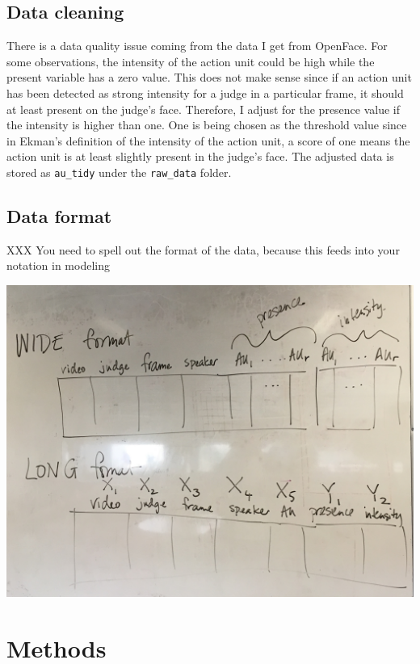 \documentclass{monashthesis}
\begin{document}
\hypertarget{data-cleaning}{%
\section{Data cleaning}\label{data-cleaning}}

There is a data quality issue coming from the data I get from OpenFace. For some observations, the intensity of the action unit could be high while the present variable has a zero value. This does not make sense since if an action unit has been detected as strong intensity for a judge in a particular frame, it should at least present on the judge's face. Therefore, I adjust for the presence value if the intensity is higher than one. One is being chosen as the threshold value since in Ekman's definition of the intensity of the action unit, a score of one means the action unit is at least slightly present in the judge's face. The adjusted data is stored as \texttt{au\_tidy} under the \texttt{raw\_data} folder.

\hypertarget{data-format}{%
\section{Data format}\label{data-format}}

XXX You need to spell out the format of the data, because this feeds into your notation in modeling

\includegraphics[width=15cm]{figures/data_format.jpg}

\hypertarget{methods}{%
\chapter{Methods}\label{methods}}
\end{document}
